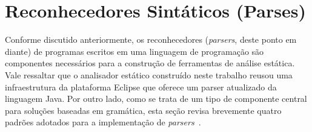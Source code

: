 
 


\section{Reconhecedores Sintáticos (Parses)}

Conforme discutido anteriormente, os reconhecedores (\textit{parsers}, deste ponto 
em diante) de programas escritos em uma linguagem de programação 
são componentes necessários para a construção de ferramentas de análise 
estática. Vale ressaltar que o analisador estático construído neste trabalho reusou uma infraestrutura 
da plataforma Eclipse que oferece um parser atualizado da linguagem Java. Por outro lado, como 
se trata de um tipo de componente central para soluções baseadas em gramática, esta seção 
revisa brevemente quatro padrões adotados para a implementação de \textit{parsers}~\cite{Parr:2009:LIP:1823613}.

